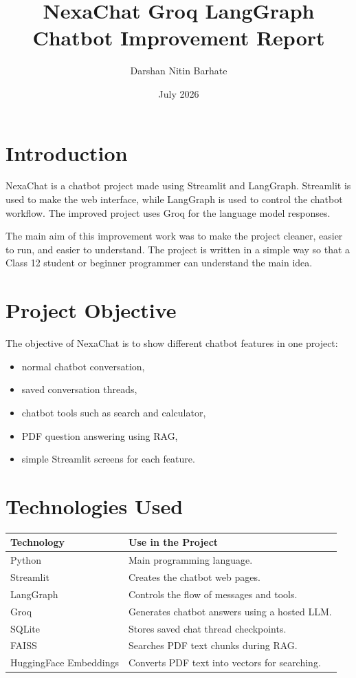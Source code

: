 \documentclass[12pt]{article}
\title{NexaChat Groq LangGraph Chatbot Improvement Report}
\author{Darshan Nitin Barhate}
\date{July 2026}
\begin{document}
\maketitle

\section{Introduction}
NexaChat is a chatbot project made using Streamlit and LangGraph. Streamlit is used to make the web interface, while LangGraph is used to control the chatbot workflow. The improved project uses Groq for the language model responses.

The main aim of this improvement work was to make the project cleaner, easier to run, and easier to understand. The project is written in a simple way so that a Class 12 student or beginner programmer can understand the main idea.

\section{Project Objective}
The objective of NexaChat is to show different chatbot features in one project:
\begin{itemize}[leftmargin=*]
    \item normal chatbot conversation,
    \item saved conversation threads,
    \item chatbot tools such as search and calculator,
    \item PDF question answering using RAG,
    \item simple Streamlit screens for each feature.
\end{itemize}

\section{Technologies Used}
\begin{tabular}{|>{\raggedright\arraybackslash}p{4cm}|>{\raggedright\arraybackslash}p{9cm}|}
\hline
\textbf{Technology} & \textbf{Use in the Project} \\
\hline
Python & Main programming language. \\
\hline
Streamlit & Creates the chatbot web pages. \\
\hline
LangGraph & Controls the flow of messages and tools. \\
\hline
Groq & Generates chatbot answers using a hosted LLM. \\
\hline
SQLite & Stores saved chat thread checkpoints. \\
\hline
FAISS & Searches PDF text chunks during RAG. \\
\hline
HuggingFace Embeddings & Converts PDF text into vectors for searching. \\
\hline
\end{tabular}
\end{document}
